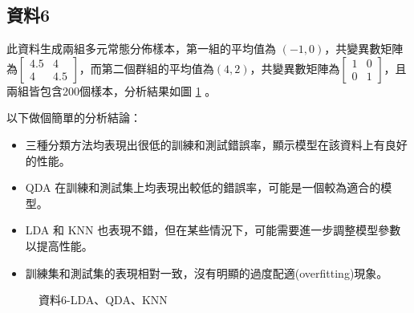 \documentclass[12pt, a4paper]{article}
\begin{document}
\subsection{資料6}
此資料生成兩組多元常態分佈樣本，第一組的平均值為 $(-1, 0)$，共變異數矩陣為$\begin{bmatrix}4.5 & 4 \\4 & 4.5 \end{bmatrix}$，而第二個群組的平均值為$(4, 2)$，共變異數矩陣為$\begin{bmatrix}1 & 0 \\0 & 1 \end{bmatrix}$，且兩組皆包含200個樣本，分析結果如圖 \ref{fig:la6-LDAQDAKNN} 。

以下做個簡單的分析結論：
\begin{itemize}
\item 三種分類方法均表現出很低的訓練和測試錯誤率，顯示模型在該資料上有良好的性能。
\item QDA 在訓練和測試集上均表現出較低的錯誤率，可能是一個較為適合的模型。
\item LDA 和 KNN 也表現不錯，但在某些情況下，可能需要進一步調整模型參數以提高性能。
\item 訓練集和測試集的表現相對一致，沒有明顯的過度配適(overfitting)現象。
\end{itemize}
\begin{table} [H]
\centering
    \caption{資料6之LDA、QDA、KNN錯判率}\label{tb:la6-LDAQDAKNN}
    \renewcommand\arraystretch{1.5}
\end{table}
 \vspace{30pt}
\begin{figure}[H]
    \caption{資料6-LDA、QDA、KNN}
    \label{fig:la6-LDAQDAKNN}
\end{figure}
\end{document}
